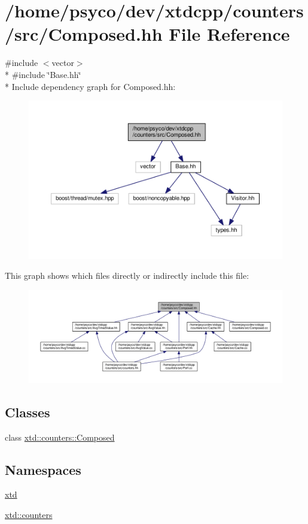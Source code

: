 \hypertarget{Composed_8hh}{}\section{/home/psyco/dev/xtdcpp/counters/src/\+Composed.hh File Reference}
\label{Composed_8hh}
{\ttfamily \#include $<$vector$>$}\\*
{\ttfamily \#include \char`\"{}Base.\+hh\char`\"{}}\\*
Include dependency graph for Composed.\+hh\+:
\nopagebreak
\begin{figure}[H]
\begin{center}
\leavevmode
\includegraphics[width=350pt]{Composed_8hh__incl}
\end{center}
\end{figure}
This graph shows which files directly or indirectly include this file\+:
\nopagebreak
\begin{figure}[H]
\begin{center}
\leavevmode
\includegraphics[width=350pt]{Composed_8hh__dep__incl}
\end{center}
\end{figure}
\subsection*{Classes}
\begin{DoxyCompactItemize}
\item 
class \hyperlink{classxtd_1_1counters_1_1Composed}{xtd\+::counters\+::\+Composed}
\end{DoxyCompactItemize}
\subsection*{Namespaces}
\begin{DoxyCompactItemize}
\item 
 \hyperlink{namespacextd}{xtd}
\item 
 \hyperlink{namespacextd_1_1counters}{xtd\+::counters}
\end{DoxyCompactItemize}
